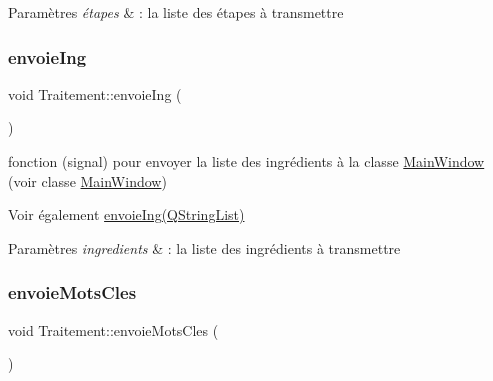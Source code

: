 \begin{DoxyParams}{Paramètres}
{\em étapes} & \+: la liste des étapes à transmettre \\
\hline
\end{DoxyParams}
\mbox{\label{classTraitement_a8db23635eb895875b0f60acece723df4}} 
\subsubsection{\texorpdfstring{envoie\+Ing}{envoieIng}}
{\footnotesize\ttfamily void Traitement\+::envoie\+Ing (\begin{DoxyParamCaption}\item[{Q\+String\+List}]{ }\end{DoxyParamCaption})\hspace{0.3cm}{\ttfamily [signal]}}



fonction (signal) pour envoyer la liste des ingrédients à la classe \hyperlink{classMainWindow}{Main\+Window} (voir classe \hyperlink{classMainWindow}{Main\+Window}) 

\begin{DoxySeeAlso}{Voir également}
\hyperlink{classTraitement_a8db23635eb895875b0f60acece723df4}{envoie\+Ing(\+Q\+String\+List)} 
\end{DoxySeeAlso}

\begin{DoxyParams}{Paramètres}
{\em ingredients} & \+: la liste des ingrédients à transmettre \\
\hline
\end{DoxyParams}
\mbox{\label{classTraitement_a4df691c4f46371e6c2b6b4c4df102819}} 
\subsubsection{\texorpdfstring{envoie\+Mots\+Cles}{envoieMotsCles}}
{\footnotesize\ttfamily void Traitement\+::envoie\+Mots\+Cles (\begin{DoxyParamCaption}\item[{Q\+String}]{ }\end{DoxyParamCaption})\hspace{0.3cm}{\ttfamily [signal]}}



